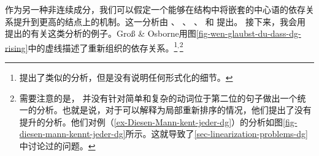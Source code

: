 作为另一种非连续成分，我们可以假定一个能够在结构中将嵌套的中心语的依存关系提升到更高的结点上的机制。这一分析由 \citet{Kunze68a-u}、 \citet{Hudson97a,Hudson2000a}、 \citet{Kahane97a}、 \citet{KNR98a}和 \citet{GO2009a}提出。
接下来，我会用 \citet{GO2009a}提出的有关这类分析的例子。Groß \& Osborne用图\vref{fig-wen-glaubst-du-dass-dg-rising}中的虚线描述了重新组织的依存关系。\footnote{%
 \citet[]{EH2003a}提出了类似的分析，但是没有说明任何形式化的细节。
}$^,$\footnote{%
需要注意的是， \citet{GO2009a}并没有针对简单和复杂的动词位于第二位的句子做出一个统一的分析。也就是说，对于可以解释为局部重新排序的情况，他们提出了没有提升的分析。他们对例（\ref{ex-Diesen-Mann-kent-jeder-dg}）的分析如图\ref{fig-diesen-mann-kennt-jeder-dg}所示。这就导致了\ref{sec-linearization-problems-dg}中讨论过的问题。
}
